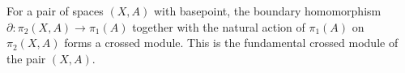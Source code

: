 For a pair of spaces $(X, A)$ with basepoint, the boundary homomorphism $\partial: \pi_2(X, A) \rightarrow \pi_1(A)$ together with the natural action of $\pi_1(A)$ on $\pi_2(X, A)$ forms a crossed module. This is the fundamental crossed module of the pair $(X, A)$.
